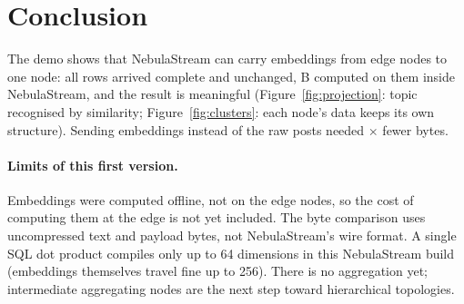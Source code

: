 \documentclass[11pt,a4paper]{article}
\begin{document}
\section{Conclusion}

The demo shows that NebulaStream can carry embeddings from \nWorkers{} edge nodes to one node: all
\rowsTotal{} rows arrived complete and unchanged, B computed on them inside NebulaStream, and the
result is meaningful (Figure~\ref{fig:projection}: topic recognised by similarity;
Figure~\ref{fig:clusters}: each node's data keeps its own structure). Sending embeddings instead of
the raw posts needed \ratio$\times$ fewer bytes.

\paragraph{Limits of this first version.}
Embeddings were computed offline, not on the edge nodes, so the cost of computing them at the edge is
not yet included. The byte comparison uses uncompressed text and payload bytes, not NebulaStream's
wire format. A single SQL dot product compiles only up to 64 dimensions in this NebulaStream build
(embeddings themselves travel fine up to 256). There is no aggregation yet; intermediate aggregating
nodes are the next step toward hierarchical topologies.
\end{document}
